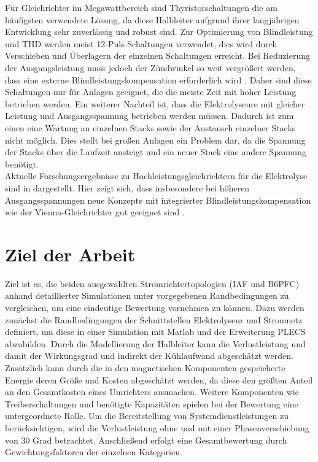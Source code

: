 Für Gleichrichter im Megawattbereich sind Thyristorschaltungen die am häufigsten verwendete Lösung, da diese Halbleiter aufgrund ihrer langjährigen Entwicklung sehr zuverlässig und robust sind. Zur Optimierung von Blindleistung und \gls{THD} werden meist 12-Puls-Schaltungen verwendet, dies wird durch Verschieben und Überlagern der einzelnen Schaltungen erreicht. Bei Reduzierung der Ausgangsleistung muss jedoch der Zündwinkel so weit vergrößert werden, dass eine externe Blindleistungskompensation erforderlich wird \cite{HydrogenElectronicTopologies}. Daher sind diese Schaltungen nur für Anlagen geeignet, die die meiste Zeit mit hoher Leistung betrieben werden. Ein weiterer Nachteil ist, dass die Elektrolyseure mit gleicher Leistung und Ausgangsspannung betrieben werden müssen. Dadurch ist zum einen eine Wartung an einzelnen Stacks sowie der Austausch einzelner Stacks nicht möglich. Dies stellt bei großen Anlagen ein Problem dar, da die Spannung der Stacks über die Laufzeit ansteigt und ein neuer Stack eine andere Spannung benötigt.\\
Aktuelle Forschungsergebnisse zu Hochleistungsgleichrichtern für die Elektrolyse sind in \cite{HydrogenRectifier} dargestellt. Hier zeigt sich, dass insbesondere bei höheren Ausgangsspannungen neue Konzepte mit integrierter Blindleistungskompensation wie der Vienna-Gleichrichter gut geeignet sind \cite{HydrogenRectifier}.
\pagebreak
\section{Ziel der Arbeit}
Ziel ist es, die beiden ausgewählten Stromrichtertopologien (\gls{IAF} und \gls{B6PFC}) anhand detaillierter Simulationen unter vorgegebenen Randbedingungen zu vergleichen, um eine eindeutige Bewertung vornehmen zu können. Dazu werden zunächst die Randbedingungen der Schnittstellen Elektrolyseur und Stromnetz definiert, um diese in einer Simulation mit Matlab und der Erweiterung PLECS abzubilden. Durch die Modellierung der Halbleiter kann die Verlustleistung und damit der Wirkungsgrad und indirekt der Kühlaufwand abgeschätzt werden. Zusätzlich kann durch die in den magnetischen Komponenten gespeicherte Energie deren Größe und Kosten abgeschätzt werden, da diese den größten Anteil an den Gesamtkosten eines Umrichters ausmachen. Weitere Komponenten wie Treiberschaltungen und benötigte Kapazitäten spielen bei der Bewertung eine untergeordnete Rolle. Um die Bereitstellung von Systemdienstleistungen zu berücksichtigen, wird die Verlustleistung ohne und mit einer Phasenverschiebung von 30 Grad betrachtet. Anschließend erfolgt eine Gesamtbewertung durch Gewichtungsfaktoren der einzelnen Kategorien.
